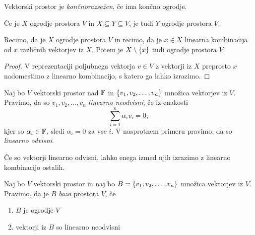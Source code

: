 \documentclass[12pt, a4paper]{article}
\begin{document}
\begin{okvir}
\begin{definicija}
Vektorski prostor je \emph{končnorazsežen}, če ima končno ogrodje.
\end{definicija}
\end{okvir}

\begin{trditev}
Če je $X$ ogrodje prostora $V$ in $X\subseteq Y\subseteq V$, je tudi $Y$ ogrodje prostora $V$.
\end{trditev}

\obvs

\begin{trditev}\label{td:ogrodja}
Recimo, da je $X$ ogrodje prostora $V$ in recimo, da je $x\in X$ linearna kombinacija od $x$ različnih vektorjev iz $X$. Potem je $X\setminus\left\{x\right\}$ tudi ogrodje prostora $V$.
\end{trditev}

\begin{proof}
V reprezentaciji poljubnega vektorja $v\in V$ z vektorji iz $X$ preprosto $x$ nadomestimo z linearno kombinacijo, s katero ga lahko izrazimo.
\end{proof}

\begin{definicija}
Naj bo $V$ vektorski prostor nad $\mathbb{F}$ in $\left\{v_1,v_2,\dots,v_n\right\}$ množica vektorjev iz $V$. Pravimo, da so $v_1,v_2,\dots,v_n$ \emph{linearno neodvisni}, če iz enakosti
\[
\sum_{i=1}^n\alpha_iv_i=0,
\]
kjer so $\alpha_i\in\mathbb{F}$, sledi $\alpha_i=0$ za vse $i$. V nasprotnem primeru pravimo, da so \emph{linearno odvisni}.
\end{definicija}

\begin{opomba}
Če so vektorji linearno odvisni, lahko enega izmed njih izrazimo z linearno kombinacijo ostalih.
\end{opomba}

\begin{okvir}
\begin{definicija}
Naj bo $V$ vektorski prostor in naj bo $B=\left\{v_1,v_2,\dots,v_n\right\}$ množica vektorjev iz $V$. Pravimo, da je $B$ \emph{baza} prostora $V$, če

\begin{enumerate}[label=\roman*)]
\item $B$ je ogrodje $V$
\item vektorji iz $B$ so linearno neodvisni
\end{enumerate}
\end{definicija}
\end{okvir}
\end{document}
